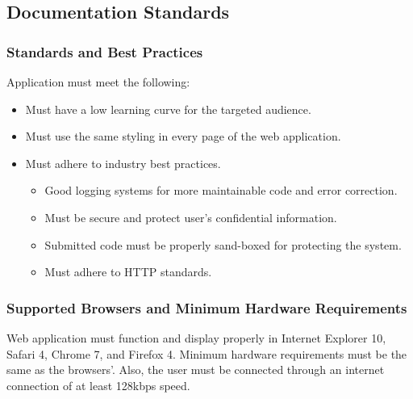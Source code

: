 \subsection{Documentation Standards}
\label{sec:stand}
\subsubsection{Standards and Best Practices}

Application must meet the following:

\begin{itemize}
\item Must have a low learning curve for the targeted audience.
\item Must use the same styling in every page of the web application.
\item Must adhere to industry best practices.
\begin{itemize}
\item Good logging systems for more maintainable code and error correction.
\item Must be secure and protect user's confidential information.
\item Submitted code must be properly sand-boxed for protecting the system.
\item Must adhere to HTTP standards.
\end{itemize}
\end{itemize}

\subsubsection{Supported Browsers and Minimum Hardware Requirements}

Web application must function and display properly in Internet Explorer 10, 
Safari 4, Chrome 7, and Firefox 4. Minimum hardware requirements must be the same as the browsers'. Also, the user must be connected through an internet connection of at least 128kbps speed.
